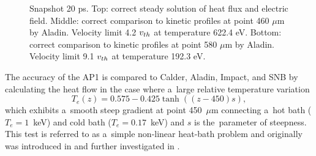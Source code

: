 \begin{figure}[tbh]
  \begin{center}
    \begin{tabular}{c}
    \end{tabular}
  \caption{  
  Snapshot 20 ps. Top: correct steady solution of heat flux and electric field. 
  Middle: correct comparison to kinetic profiles at point 460 $\mu$m by Aladin. 
  Velocity limit 4.2 $v_{th}$ at temperature 622.4 eV.
  Bottom: correct comparison to kinetic profiles at point 580 $\mu$m by Aladin.
  Velocity limit 9.1 $v_{th}$ at temperature 192.3 eV.
  }
  \label{fig:C7_Aladin_case5}
  \end{center} 
\end{figure}

The accuracy of the AP1 is compared to Calder, Aladin, Impact, and SNB by 
calculating the heat flow in the case
where a~large relative temperature variation
\begin{equation}
  T_e(z) = 0.575 - 0.425 \tanh\left((z-450) s\right) ,
  \label{eq:T_init}
\end{equation}
which exhibits a~smooth steep gradient at point 450~$\mu$m 
connecting a~hot bath ($T_e = 1$~keV) 
and cold bath ($T_e = 0.17$~keV) and $s$ is the~parameter of steepness. 
This test is referred to as a~simple non-linear heat-bath problem and
originally was introduced in \cite{marocchino2013} and further investigated
in  \cite{Sorbo_2015, Sorbo_2016, Sherlock_PoP2017, Brodrick_PoP2017}.

